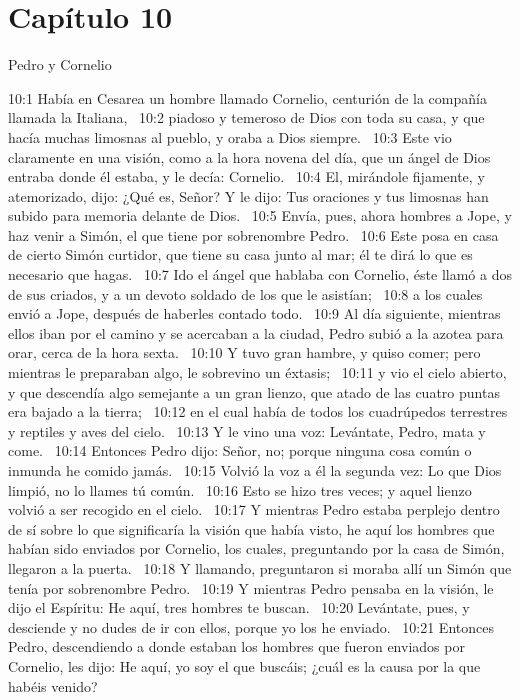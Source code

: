 \section*{Capítulo 10}
Pedro y Cornelio 

10:1 Había en Cesarea un hombre llamado Cornelio, centurión de la compañía llamada la Italiana,  
10:2 piadoso y temeroso de Dios con toda su casa, y que hacía muchas limosnas al pueblo, y oraba a Dios siempre.  
10:3 Este vio claramente en una visión, como a la hora novena del día, que un ángel de Dios entraba donde él estaba, y le decía: Cornelio.  
10:4 El, mirándole fijamente, y atemorizado, dijo: ¿Qué es, Señor? Y le dijo: Tus oraciones y tus limosnas han subido para memoria delante de Dios.  
10:5 Envía, pues, ahora hombres a Jope, y haz venir a Simón, el que tiene por sobrenombre Pedro.  
10:6 Este posa en casa de cierto Simón curtidor, que tiene su casa junto al mar; él te dirá lo que es necesario que hagas.  
10:7 Ido el ángel que hablaba con Cornelio, éste llamó a dos de sus criados, y a un devoto soldado de los que le asistían;  
10:8 a los cuales envió a Jope, después de haberles contado todo.  
10:9 Al día siguiente, mientras ellos iban por el camino y se acercaban a la ciudad, Pedro subió a la azotea para orar, cerca de la hora sexta.  
10:10 Y tuvo gran hambre, y quiso comer; pero mientras le preparaban algo, le sobrevino un éxtasis;  
10:11 y vio el cielo abierto, y que descendía algo semejante a un gran lienzo, que atado de las cuatro puntas era bajado a la tierra;  
10:12 en el cual había de todos los cuadrúpedos terrestres y reptiles y aves del cielo.  
10:13 Y le vino una voz: Levántate, Pedro, mata y come.  
10:14 Entonces Pedro dijo: Señor, no; porque ninguna cosa común o inmunda he comido jamás.  
10:15 Volvió la voz a él la segunda vez: Lo que Dios limpió, no lo llames tú común.  
10:16 Esto se hizo tres veces; y aquel lienzo volvió a ser recogido en el cielo.  
10:17 Y mientras Pedro estaba perplejo dentro de sí sobre lo que significaría la visión que había visto, he aquí los hombres que habían sido enviados por Cornelio, los cuales, preguntando por la casa de Simón, llegaron a la puerta.  
10:18 Y llamando, preguntaron si moraba allí un Simón que tenía por sobrenombre Pedro.  
10:19 Y mientras Pedro pensaba en la visión, le dijo el Espíritu: He aquí, tres hombres te buscan.  
10:20 Levántate, pues, y desciende y no dudes de ir con ellos, porque yo los he enviado.  
10:21 Entonces Pedro, descendiendo a donde estaban los hombres que fueron enviados por Cornelio, les dijo: He aquí, yo soy el que buscáis; ¿cuál es la causa por la que habéis venido?  
